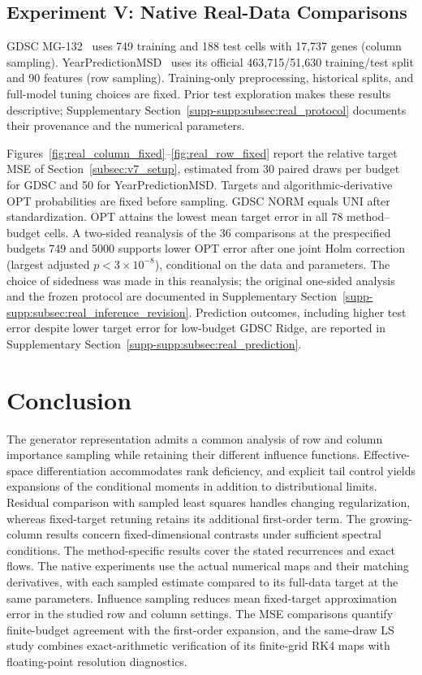 \documentclass[pdflatex,iicol,sn-mathphys-ay]{sn-jnl}
\theoremstyle{thmstyleone}
\theoremstyle{thmstylethree}
\theoremstyle{thmstyletwo}
\begin{document}
\subsection{Experiment V: Native Real-Data Comparisons}
\label{subsec:real_data}
GDSC MG-132~\citep{yang2013gdsc} uses 749 training and 188 test cells
with 17,737 genes (column sampling). YearPredictionMSD~\citep{bertin2011year}
uses its official 463,715/51,630 training/test split and 90 features
(row sampling). Training-only preprocessing, historical splits, and
full-model tuning choices are fixed. Prior test exploration makes these
results descriptive; Supplementary
Section~\ref{supp-supp:subsec:real_protocol} documents their provenance and
the numerical parameters.

Figures~\ref{fig:real_column_fixed}--\ref{fig:real_row_fixed} report the
relative target MSE of Section~\ref{subsec:v7_setup}, estimated from
30 paired draws per budget for GDSC and 50 for YearPredictionMSD.
Targets and algorithmic-derivative OPT probabilities are fixed before
sampling. GDSC NORM equals UNI after standardization.
OPT attains the lowest mean target error in all 78 method--budget cells.
A two-sided reanalysis of the 36 comparisons at the prespecified budgets
749 and 5000 supports lower OPT error after one joint Holm correction
(largest adjusted $p<3\times10^{-8}$), conditional on the data and parameters.
The choice of sidedness was made in this reanalysis; the original one-sided
analysis and the frozen protocol are documented in Supplementary
Section~\ref{supp-supp:subsec:real_inference_revision}.
Prediction outcomes, including higher test error despite lower target
error for low-budget GDSC Ridge, are reported in Supplementary
Section~\ref{supp-supp:subsec:real_prediction}.


\FloatBarrier
\section{Conclusion}
\label{sec:conclusion}
The generator representation admits a common analysis of row and column
importance sampling while retaining their different influence functions.
Effective-space differentiation accommodates rank deficiency, and explicit
tail control yields expansions of the conditional moments in addition to distributional limits.
Residual comparison with sampled least squares handles changing
regularization, whereas fixed-target retuning retains its additional
first-order term. The growing-column results concern fixed-dimensional
contrasts under sufficient spectral conditions. The method-specific results
cover the stated recurrences and exact flows.
The native experiments use the actual numerical maps and their matching derivatives, with each sampled estimate compared to its full-data target at the same parameters. Influence sampling reduces mean fixed-target approximation error in the studied row and column settings. The MSE comparisons quantify finite-budget agreement with the first-order expansion, and the same-draw LS study combines exact-arithmetic verification of its finite-grid RK4 maps with floating-point resolution diagnostics.
\end{document}
